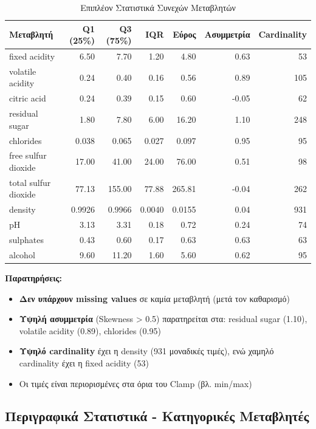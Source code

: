\documentclass[12pt,a4paper]{article}
\begin{document}
\begin{table}[H]
\centering
\caption{Επιπλέον Στατιστικά Συνεχών Μεταβλητών}
\label{tab:desc_continuous2}
\scriptsize
\begin{tabular}{lrrrrrr}
\toprule
\textbf{Μεταβλητή} & \textbf{Q1 (25\%)} & \textbf{Q3 (75\%)} & \textbf{IQR} & \textbf{Εύρος} & \textbf{Ασυμμετρία} & \textbf{Cardinality} \\
\midrule
fixed acidity & 6.50 & 7.70 & 1.20 & 4.80 & 0.63 & 53 \\
volatile acidity & 0.24 & 0.40 & 0.16 & 0.56 & 0.89 & 105 \\
citric acid & 0.24 & 0.39 & 0.15 & 0.60 & -0.05 & 62 \\
residual sugar & 1.80 & 7.80 & 6.00 & 16.20 & 1.10 & 248 \\
chlorides & 0.038 & 0.065 & 0.027 & 0.097 & 0.95 & 95 \\
free sulfur dioxide & 17.00 & 41.00 & 24.00 & 76.00 & 0.51 & 98 \\
total sulfur dioxide & 77.13 & 155.00 & 77.88 & 265.81 & -0.04 & 262 \\
density & 0.9926 & 0.9966 & 0.0040 & 0.0155 & 0.04 & 931 \\
pH & 3.13 & 3.31 & 0.18 & 0.72 & 0.24 & 74 \\
sulphates & 0.43 & 0.60 & 0.17 & 0.63 & 0.63 & 63 \\
alcohol & 9.60 & 11.20 & 1.60 & 5.60 & 0.62 & 95 \\
\bottomrule
\end{tabular}
\end{table}

\textbf{Παρατηρήσεις:}
\begin{itemize}
    \item \textbf{Δεν υπάρχουν missing values} σε καμία μεταβλητή (μετά τον καθαρισμό)
    \item \textbf{Υψηλή ασυμμετρία} (Skewness > 0.5) παρατηρείται στα: residual sugar (1.10), volatile acidity (0.89), chlorides (0.95)
    \item \textbf{Υψηλό cardinality} έχει η density (931 μοναδικές τιμές), ενώ χαμηλό cardinality έχει η fixed acidity (53)
    \item Οι τιμές είναι περιορισμένες στα όρια του Clamp (βλ. min/max)
\end{itemize}

\subsection{Περιγραφικά Στατιστικά - Κατηγορικές Μεταβλητές}
\end{document}
